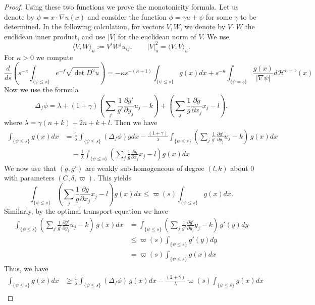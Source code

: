 \documentclass[12pt,reqno]{amsart}
\newcommand{\del}{\partial}
\numberwithin{equation}{section}
\begin{document}
\begin{proof}
Using these two functions we prove the monotonicity formula.  Let us denote by $\psi = x\cdot \nabla u(x)$ and consider the function $\phi= \gamma u + \psi $ for some $\gamma$ to be determined.  In the following calculation, for vectors $V,W$, we denote by $V\cdot W$ the euclidean inner product, and use $|V|$ for the euclidean norm of $V$.  We use 
\[
\langle V,W \rangle_u := V^iW^ju_{ij}, \qquad |V|_u^2 = \langle V, V \rangle_u.
\]
For $\kappa >0$ we compute
\[
\frac{d}{ds}\left(s^{-\kappa}\int_{\{\psi \leq s\}} e^{-f}\sqrt{\det D^2u}\right) = -\kappa s^{-(\kappa+1)}\int_{\{\psi \leq s\}}g(x)dx + s^{-\kappa}\int_{\{\psi =s\}}\frac{g(x)}{|\nabla \psi|}d\mathcal{H}^{n-1}(x)
\]
Now we use the formula
\[
\Delta_f \phi = \lambda + (1+\gamma)\left(\sum_j\frac{1}{g'}\frac{\del g'}{\del y_j}u_j-k\right) + \left(\sum_j\frac{1}{g}\frac{\del g}{\del x_j}x_j-l\right).
\]
where $\lambda =\gamma(n+k) +2n+k +l$. Then we have
\begin{equation}\label{eq: strictIneqMonotonicityFirstStep}
\begin{aligned}
\int_{\{\psi \leq s\}}g(x)dx &= \frac{1}{\lambda}\int_{\{\psi \leq s\}}(\Delta_f \phi)gdx - \frac{(1+\gamma)}{\lambda}\int_{\{\psi \leq s\}}\left(\sum_j\frac{1}{g'}\frac{\del g'}{\del y_j}u_j-k\right)\, g(x)dx\\
&\quad -\frac{1}{\lambda}\int_{\{\psi \leq s\}} \left(\sum_j\frac{1}{g}\frac{\del g}{\del x_j}x_j-l\right)g(x)dx
\end{aligned}
\end{equation}
We now use that $(g,g')$ are weakly sub-homogeneous of degree $(l,k)$ about $0$ with parameters $(C,\delta, \varpi)$.  This yields
\[
\int_{\{\psi \leq s\}} \left(\sum_j\frac{1}{g}\frac{\del g}{\del x_j}x_j-l\right)g(x)dx \leq \varpi(s)\int_{\{\psi \leq s\}}g(x)dx.
\]
Similarly, by the optimal transport equation we have
\[
\begin{aligned}
\int_{\{\psi \leq s\}}\left(\sum_j\frac{1}{g'}\frac{\del g'}{\del y_j}u_j-k\right)\, g(x)dx &= \int_{\{\psi \leq s\}}\left(\sum_j\frac{1}{g'}\frac{\del g'}{\del y_j}y_j-k\right)\, g'(y)dy\\
&\leq \varpi(s)\int_{\{\psi \leq s\}}g'(y)dy \\
&= \varpi(s)\int_{\{\psi \leq s\}}g(x)dx
\end{aligned}
\]
Thus, we have
\begin{equation}\label{eq: strictIneqMonotonicitySecondStep}
\begin{aligned}
\int_{\{\psi \leq s\}}g(x)dx &\geq \frac{1}{\lambda}\int_{\{\psi \leq s\}}(\Delta_f \phi)\,g(x)dx - \frac{(2+\gamma)}{\lambda}\varpi(s)\int_{\{\psi \leq s\}}g(x)dx\\

\end{aligned}
\end{equation}
\end{proof}
\end{document}
